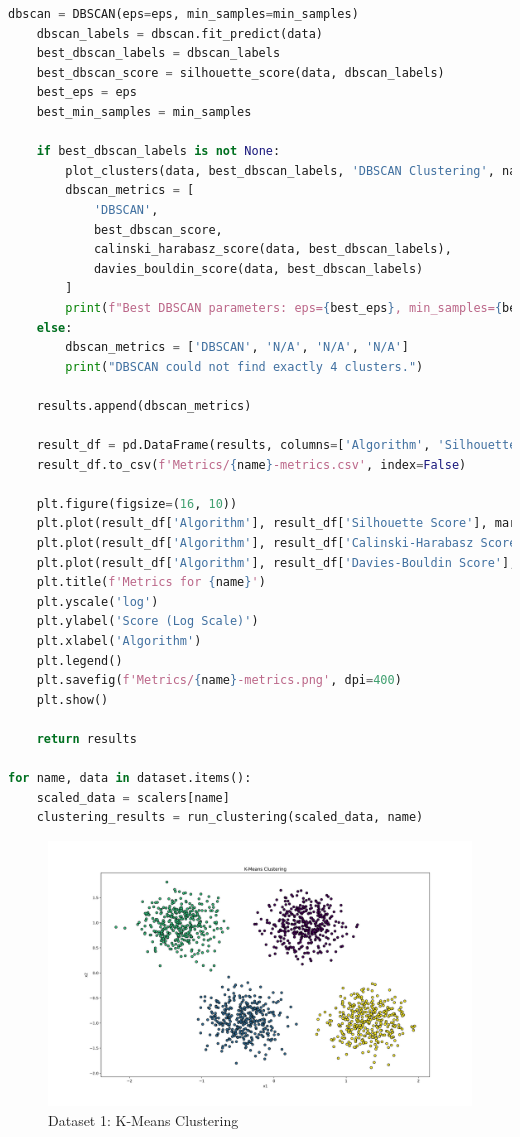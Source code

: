 \begin{lstlisting}[language=Python, caption=Code to Cluster Datasets and generate Metrics]
    dbscan = DBSCAN(eps=eps, min_samples=min_samples)
    dbscan_labels = dbscan.fit_predict(data)
    best_dbscan_labels = dbscan_labels
    best_dbscan_score = silhouette_score(data, dbscan_labels)
    best_eps = eps
    best_min_samples = min_samples

    if best_dbscan_labels is not None:
        plot_clusters(data, best_dbscan_labels, 'DBSCAN Clustering', name)
        dbscan_metrics = [
            'DBSCAN',
            best_dbscan_score,
            calinski_harabasz_score(data, best_dbscan_labels),
            davies_bouldin_score(data, best_dbscan_labels)
        ]
        print(f"Best DBSCAN parameters: eps={best_eps}, min_samples={best_min_samples}")
    else:
        dbscan_metrics = ['DBSCAN', 'N/A', 'N/A', 'N/A']
        print("DBSCAN could not find exactly 4 clusters.")
    
    results.append(dbscan_metrics)

    result_df = pd.DataFrame(results, columns=['Algorithm', 'Silhouette Score', 'Calinski-Harabasz Score', 'Davies-Bouldin Score'])
    result_df.to_csv(f'Metrics/{name}-metrics.csv', index=False)

    plt.figure(figsize=(16, 10))
    plt.plot(result_df['Algorithm'], result_df['Silhouette Score'], marker='o', label='Silhouette Score')
    plt.plot(result_df['Algorithm'], result_df['Calinski-Harabasz Score'], marker='o', label='Calinski-Harabasz Score')
    plt.plot(result_df['Algorithm'], result_df['Davies-Bouldin Score'], marker='o', label='Davies-Bouldin Score')
    plt.title(f'Metrics for {name}')
    plt.yscale('log')
    plt.ylabel('Score (Log Scale)')
    plt.xlabel('Algorithm')
    plt.legend()
    plt.savefig(f'Metrics/{name}-metrics.png', dpi=400)
    plt.show()

    return results

for name, data in dataset.items():
    scaled_data = scalers[name]
    clustering_results = run_clustering(scaled_data, name)

\end{lstlisting}

\begin{figure}[H]
	\centering
	\includegraphics[width=0.9\linewidth]{Images/Clusters-5-v0-K-Means Clustering.png}
	\caption{Dataset 1: K-Means Clustering}
	\label{fig:clusters-5-v0-k-means-clustering}
\end{figure}

